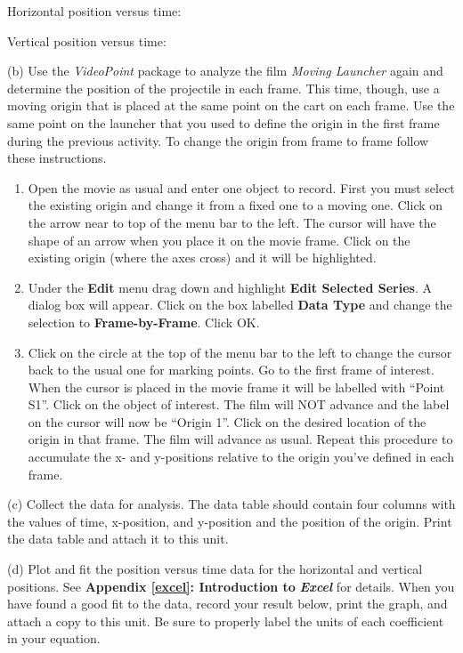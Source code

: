 Horizontal position versus time:
\vspace{10mm}

Vertical position versus time:
\vspace{10mm}

(b) Use the \emph{VideoPoint} package to analyze the film \emph{Moving
Launcher} again and determine the position of the projectile in each
frame. This time, though, use a moving origin that is placed
at the same point on the cart on each frame. Use the same point on
the launcher that you used to define the origin in the first frame
during the previous activity. To change the origin from frame to frame
follow these instructions.

\begin{enumerate}
\item Open the movie as usual and enter one object to record. First you
must select the existing origin and change it from a fixed one to
a moving one. Click on the arrow near to top of the menu bar to the
left. The cursor will have the shape of an arrow when you place it
on the movie frame. Click on the existing origin (where the axes cross)
and it will be highlighted.
\item Under the \textbf{Edit} menu drag down and highlight \textbf{Edit
Selected Series}. A dialog box will appear. Click on the box labelled
\textbf{Data Type} and change the selection to \textbf{Frame-by-Frame}.
Click OK.
\item Click on the circle at the top of the menu bar to the left to change
the cursor back to the usual one for marking points. Go to the first
frame of interest. When the cursor is placed in the movie frame it
will be labelled with {}``Point S1''. Click on the object of interest.
The film will NOT advance and the label on the cursor will now be
{}``Origin 1''. Click on the desired location of the origin in that
frame. The film will advance as usual. Repeat this procedure to accumulate
the x- and y-positions relative to the origin you've defined in each
frame.
\end{enumerate}
(c) Collect the data for analysis. The data table should contain four
columns with the values of time, x-position, and y-position and the
position of the origin. Print the data table and attach it to this unit.

(d) Plot and fit the position versus time data for the horizontal
and vertical positions. See \textbf{Appendix \ref{excel}: Introduction to} \textbf{\emph{Excel}}
for details. When you have found a good fit to the data, record your
result below, print the graph, and attach a copy to this unit. Be
sure to properly label the units of each coefficient in your equation.

